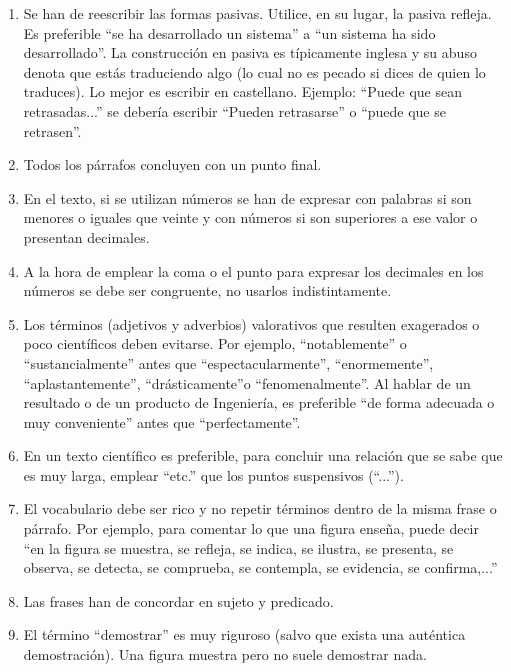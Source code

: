 \begin{enumerate}
\item Se han de reescribir   las  formas pasivas.  Utilice,  en  su  lugar,  la  pasiva  refleja.  Es preferible “se ha desarrollado un sistema” a “un sistema ha sido desarrollado”. La construcción en pasiva es típicamente inglesa y su abuso denota que estás traduciendo algo (lo cual no es pecado si dices de quien lo traduces). Lo mejor es escribir en castellano. Ejemplo: “Puede  que  sean  retrasadas...”    se  debería  escribir  “Pueden  retrasarse”  o  “puede  que  se retrasen”.

\item Todos los párrafos concluyen con un punto final.

\item En  el  texto,  si se utilizan números se han de expresar   con  palabras   si  son  menores  o  iguales  que veinte y con números si son superiores a ese valor o presentan decimales.

\item A  la  hora  de  emplear  la  coma  o  el  punto  para  expresar  los decimales en los números se debe ser congruente, no usarlos indistintamente.

\item  Los términos  (adjetivos  y  adverbios)  valorativos  que  resulten  exagerados  o poco científicos deben evitarse. Por ejemplo,  “notablemente” o “sustancialmente” antes que “espectacularmente”, “enormemente”, “aplastantemente”, “drásticamente”o “fenomenalmente”. Al hablar de un resultado  o  de  un  producto  de  Ingeniería, es preferible “de forma adecuada o muy conveniente” antes que “perfectamente”.

\item En un texto científico es preferible, para concluir una relación que se sabe que es muy larga, emplear “etc.” que los puntos suspensivos (“...”).

\item El  vocabulario debe ser rico y no repetir términos dentro de la misma frase o  párrafo.  Por  ejemplo,  para comentar  lo  que  una  figura  enseña,  puede  decir “en  la  figura  se  muestra,  se  refleja,  se  indica,  se  ilustra,  se  presenta,  se observa, se detecta, se comprueba, se contempla, se evidencia, se confirma,...”

\item Las  frases han de concordar en  sujeto y predicado.

\item  El término “demostrar” es muy riguroso (salvo  que  exista  una  auténtica demostración). Una figura muestra pero no suele demostrar nada. 


\end{enumerate}
